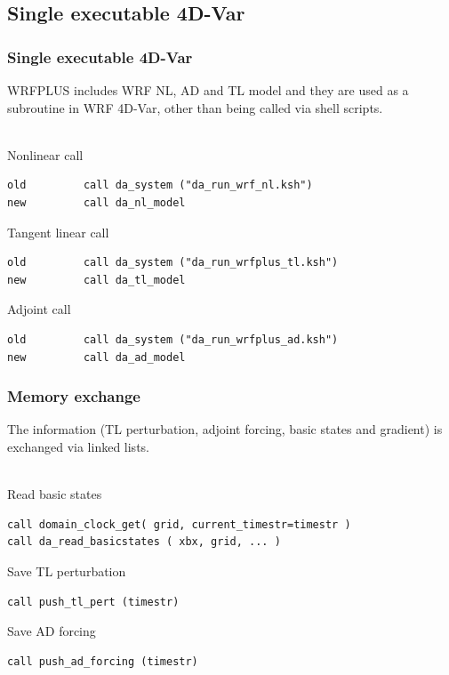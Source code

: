 \documentclass{beamer}
\begin{document}
\subsection{Single executable 4D-Var}
\begin{frame}[fragile]
\frametitle{Single executable 4D-Var}
WRFPLUS includes WRF NL, AD and TL model and they are used as a subroutine in WRF 4D-Var, other than being called via shell scripts.
~\\
~\\
\begin{beamerboxesrounded}[ lower=postit,shadow=true]{Nonlinear call}
\begin{verbatim}
old         call da_system ("da_run_wrf_nl.ksh")
new         call da_nl_model
\end{verbatim}
\end{beamerboxesrounded}
\begin{beamerboxesrounded}[ lower=postit,shadow=true]{Tangent linear call}
\begin{verbatim}
old         call da_system ("da_run_wrfplus_tl.ksh")
new         call da_tl_model
\end{verbatim}
\end{beamerboxesrounded}
\begin{beamerboxesrounded}[ lower=postit,shadow=true]{Adjoint call}
\begin{verbatim}
old         call da_system ("da_run_wrfplus_ad.ksh")
new         call da_ad_model
\end{verbatim}
\end{beamerboxesrounded}
\end{frame}

\begin{frame}[fragile]
\frametitle{Memory exchange}
The information (TL perturbation, adjoint forcing, basic states and gradient) is exchanged via linked lists.
~\\
~\\
\begin{beamerboxesrounded}[ lower=postit,shadow=true]{Read basic states}
\begin{verbatim}
call domain_clock_get( grid, current_timestr=timestr )
call da_read_basicstates ( xbx, grid, ... )
\end{verbatim}
\end{beamerboxesrounded}
\begin{beamerboxesrounded}[ lower=postit,shadow=true]{Save TL perturbation}
\begin{verbatim}
call push_tl_pert (timestr)
\end{verbatim}
\end{beamerboxesrounded}
\begin{beamerboxesrounded}[ lower=postit,shadow=true]{Save AD forcing}
\begin{verbatim}
call push_ad_forcing (timestr)
\end{verbatim}
\end{beamerboxesrounded}
\end{frame}
\end{document}

